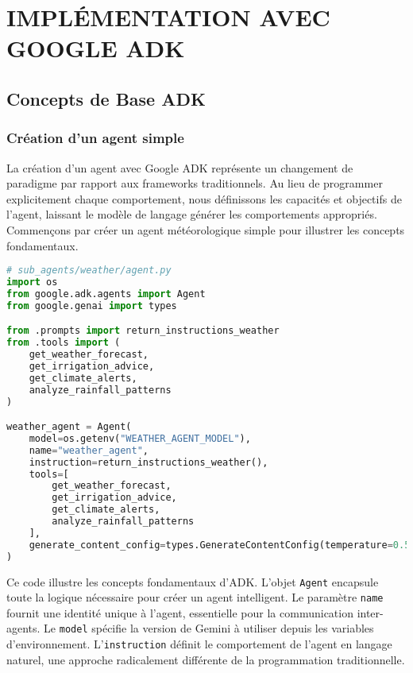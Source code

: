\chapter{IMPLÉMENTATION AVEC GOOGLE ADK}

\section{Concepts de Base ADK}

\subsection{Création d'un agent simple}

La création d'un agent avec Google ADK représente un changement de paradigme par rapport aux frameworks traditionnels. Au lieu de programmer explicitement chaque comportement, nous définissons les capacités et objectifs de l'agent, laissant le modèle de langage générer les comportements appropriés. Commençons par créer un agent météorologique simple pour illustrer les concepts fondamentaux.

 
\begin{lstlisting}[language=Python, caption=Agent météorologique avec ADK]
# sub_agents/weather/agent.py
import os
from google.adk.agents import Agent
from google.genai import types

from .prompts import return_instructions_weather
from .tools import (
    get_weather_forecast,
    get_irrigation_advice,
    get_climate_alerts,
    analyze_rainfall_patterns
)

weather_agent = Agent(
    model=os.getenv("WEATHER_AGENT_MODEL"),
    name="weather_agent",
    instruction=return_instructions_weather(),
    tools=[
        get_weather_forecast,
        get_irrigation_advice,
        get_climate_alerts,
        analyze_rainfall_patterns
    ],
    generate_content_config=types.GenerateContentConfig(temperature=0.5),
)
\end{lstlisting}

Ce code illustre les concepts fondamentaux d'ADK. L'objet \texttt{Agent} encapsule toute la logique nécessaire pour créer un agent intelligent. Le paramètre \texttt{name} fournit une identité unique à l'agent, essentielle pour la communication inter-agents. Le \texttt{model} spécifie la version de Gemini à utiliser depuis les variables d'environnement. L'\texttt{instruction} définit le comportement de l'agent en langage naturel, une approche radicalement différente de la programmation traditionnelle.


